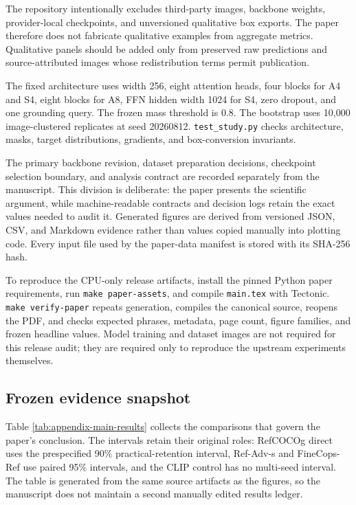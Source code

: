 \documentclass[10pt]{article}
\begin{document}
The repository intentionally excludes third-party images, backbone weights,
provider-local checkpoints, and unversioned qualitative box exports. The paper
therefore does not fabricate qualitative examples from aggregate metrics.
Qualitative panels should be added only from preserved raw predictions and
source-attributed images whose redistribution terms permit publication.

The fixed architecture uses width 256, eight attention heads, four blocks for
A4 and S4, eight blocks for A8, FFN hidden width 1024 for S4, zero dropout, and
one grounding query. The frozen mass threshold is 0.8. The bootstrap uses
10,000 image-clustered replicates at seed 20260812. \texttt{test\_study.py}
checks architecture, masks, target distributions, gradients, and box-conversion
invariants.

The primary backbone revision, dataset preparation decisions, checkpoint
selection boundary, and analysis contract are recorded separately from the
manuscript. This division is deliberate: the paper presents the scientific
argument, while machine-readable contracts and decision logs retain the exact
values needed to audit it. Generated figures are derived from versioned JSON,
CSV, and Markdown evidence rather than values copied manually into plotting
code. Every input file used by the paper-data manifest is stored with its
SHA-256 hash.

To reproduce the CPU-only release artifacts, install the pinned Python paper
requirements, run \texttt{make paper-assets}, and compile \texttt{main.tex}
with Tectonic. \texttt{make verify-paper} repeats generation, compiles the
canonical source, reopens the PDF, and checks expected phrases, metadata, page
count, figure families, and frozen headline values. Model training and dataset
images are not required for this release audit; they are required only to
reproduce the upstream experiments themselves.

\subsection{Frozen evidence snapshot}\label{frozen-evidence-snapshot}

Table \ref{tab:appendix-main-results} collects the comparisons that govern the
paper's conclusion. The intervals retain their original roles: RefCOCOg direct
uses the prespecified 90\% practical-retention interval, Ref-Adv-s and
FineCops-Ref use paired 95\% intervals, and the CLIP control has no multi-seed
interval. The table is generated from the same source artifacts as the figures,
so the manuscript does not maintain a second manually edited results ledger.
\end{document}
